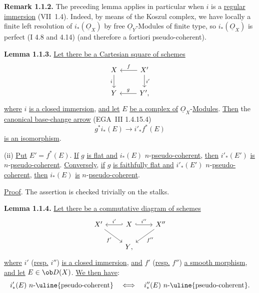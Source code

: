 \textbf{Remark 1.1.2.} The preceding lemma applies in particular when \(i\) is a \uline{regular immersion} (VII~1.4). Indeed, by means of the Koszul complex, we have locally a finite left resolution of \(i_*(\underline{O}_X)\) by free \(\underline{O}_Y\)-Modules of finite type, so \(i_*(\underline{O}_X)\) is perfect (I 4.8 and 4.14) (and therefore a fortiori pseudo-coherent).

\textbf{Lemma 1.1.3.} \uline{Let there be a Cartesian square of schemes}
\[
\begin{tikzcd}
X \arrow[d,"i"'] & X' \arrow[l,"f"'] \arrow[d,"i'"]\\
Y & Y'{,} \arrow[l,"g"']
\end{tikzcd}
\]
\uline{where} \(i\) \uline{is a closed immersion}, \uline{and let} \(E\) \uline{be a complex of} \(\underline{O}_X\)-\uline{Modules}. \uline{Then} the \uline{canonical base-change arrow} (EGA~III 1.4.15.4)
\[
  g^*i_*(E)\longrightarrow i'_*f^*(E)
\]
\uline{is an isomorphism}.

(ii) \uline{Put} \(E'=f^*(E)\). \uline{If} \(g\) \uline{is flat and} \(i_*(E)\) \(n\)-\uline{pseudo-coherent}, \uline{then} \(i'_*(E')\) \uline{is} \(n\)-\uline{pseudo-coherent}. \uline{Conversely}, \uline{if} \(g\) \uline{is faithfully flat and} \(i'_*(E')\) \(n\)-\uline{pseudo-coherent}, \uline{then} \(i_*(E)\) \uline{is} \(n\)-\uline{pseudo-coherent}.

\uline{Proof}. The assertion is checked trivially on the stalks.

\textbf{Lemma 1.1.4.}
\uline{Let there be a commutative diagram of schemes}
\[
\begin{tikzcd}
X' \arrow[dr,"f'"'] & X \arrow[l,hook',"i'"'] \arrow[r,hook,"i''"] & X'' \arrow[dl,"f''"]\\
& Y{,} &
\end{tikzcd}
\]
\uline{where} \(i'\) (\uline{resp.} \(i''\)) \uline{is a closed immersion}, \uline{and} \(f'\) (\uline{resp.} \(f''\)) \uline{a smooth morphism}, \uline{and let} \(E\in\ob D(X)\). \uline{We then have}:
\[
  i'_*(E)\ n\text{-\uline{pseudo-coherent}}
  \quad\Longleftrightarrow\quad
  i''_*(E)\ n\text{-\uline{pseudo-coherent}}.
\]

